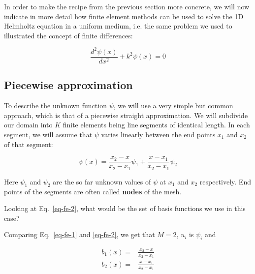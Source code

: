 \pagebreak



In order to make the recipe from the previous section more concrete, we will now indicate in more detail how finite element methods can be used to solve the 1D Helmholtz equation in a uniform medium, i.e. the same problem we used to illustrated the concept of finite differences:

\begin{equation}
\frac{d^2 \psi (x)}{d x^2} + k^2 \psi(x) = 0 \label{eq-helmholtz-1d-2}
\end{equation} 

\subsection{Piecewise approximation}

To describe the unknown function $\psi$, we will use a very simple but common approach, which is that of a piecewise straight approximation. We will subdivide our domain into $K$ finite elements being line segments of identical length. In each segment, we will assume that $\psi$ varies linearly between the end points $x_1$ and $x_2$ of that segment:

\begin{equation}
\psi(x) = \frac{x_2 - x}{x_2 - x_1} \psi_1 + \frac{x - x_1}{x_2 - x_1} \psi_2 \label{eq-fe-2}
\end{equation} 

Here $\psi_1$ and $\psi_2$ are the so far unknown values of $\psi$ at $x_1$ and $x_2$ respectively. End points of the segments are often called \textbf{nodes} of the mesh.

\begin{cue}
Looking at Eq.~\ref{eq-fe-2}, what would be the set of basis functions we use in this case?
\end{cue}

Comparing Eq.~\ref{eq-fe-1} and \ref{eq-fe-2}, we get that $M=2$, $u_i$ is $\psi_i$ and

\begin{align}
b_1(x) =& \frac{x_2 - x}{x_2 - x_1} \\
b_2(x) =& \frac{x - x_1}{x_2 - x_1}
\end{align} 

